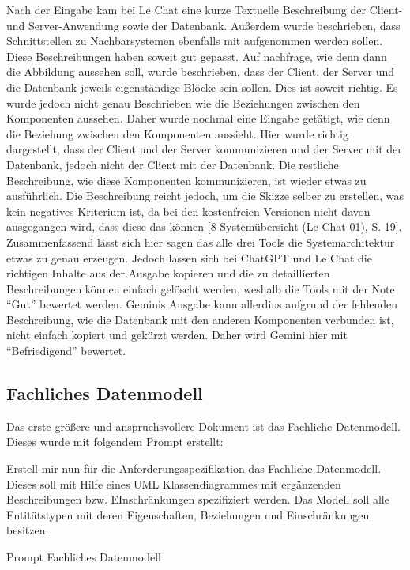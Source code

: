 Nach der Eingabe kam bei Le Chat eine kurze Textuelle Beschreibung der Client- und Server-Anwendung sowie der Datenbank. Außerdem wurde beschrieben, 
dass Schnittstellen zu Nachbarsystemen ebenfalls mit aufgenommen werden sollen. Diese Beschreibungen haben soweit gut gepasst. Auf nachfrage, wie denn 
dann die Abbildung aussehen soll, wurde beschrieben, dass der Client, der Server und die Datenbank jeweils eigenständige Blöcke sein sollen. Dies ist soweit
richtig. Es wurde jedoch nicht genau Beschrieben wie die Beziehungen zwischen den Komponenten aussehen. Daher wurde nochmal eine Eingabe getätigt, wie denn 
die Beziehung zwischen den Komponenten aussieht. Hier wurde richtig dargestellt, dass der Client und der Server kommunizieren und der Server mit der Datenbank, 
jedoch nicht der Client mit der Datenbank. Die restliche Beschreibung, wie diese Komponenten kommunizieren, ist wieder etwas zu ausführlich. Die Beschreibung 
reicht jedoch, um die Skizze selber zu erstellen, was kein negatives Kriterium ist, da bei den kostenfreien Versionen nicht davon ausgegangen wird, dass diese 
das können [8 Systemübersicht (Le Chat 01), S. 19].\\

Zusammenfassend lässt sich hier sagen das alle drei Tools die Systemarchitektur etwas zu genau erzeugen. Jedoch lassen sich bei ChatGPT und Le Chat die richtigen Inhalte 
aus der Ausgabe kopieren und die zu detaillierten Beschreibungen können einfach gelöscht werden, weshalb die Tools mit der Note ``Gut'' bewertet werden. Geminis Ausgabe
kann allerdins aufgrund der fehlenden Beschreibung, wie die Datenbank mit den anderen Komponenten verbunden ist, nicht einfach kopiert und gekürzt werden. Daher wird Gemini 
hier mit ``Befriedigend'' bewertet.


\subsection*{Fachliches Datenmodell}

Das erste größere und anspruchsvollere Dokument ist das Fachliche Datenmodell. Dieses wurde mit folgendem Prompt erstellt:

\begin{prompt}[H]
    \begin{tcolorbox}[colback=gray!20, colframe=gray!20, boxrule=0pt, sharp corners] 
        Erstell mir nun für die Anforderungsspezifikation das Fachliche Datenmodell. Dieses soll mit Hilfe eines UML Klassendiagrammes mit ergänzenden Beschreibungen 
        bzw. EInschränkungen spezifiziert werden. Das Modell soll alle Entitätstypen mit deren Eigenschaften, Beziehungen und Einschränkungen besitzen.
        \vfill
    \end{tcolorbox}
    \caption{Prompt Fachliches Datenmodell}
    \label{Prompt Fachliches Datenmodell}
\end{prompt}

